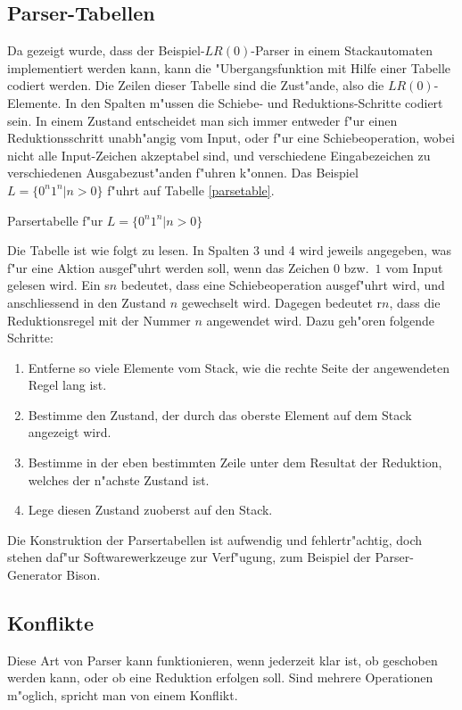\subsection{Parser-Tabellen}
Da gezeigt wurde, dass der Beispiel-$LR(0)$-Parser in einem Stackautomaten
implementiert werden kann, kann die "Ubergangsfunktion mit Hilfe
einer Tabelle codiert werden. Die Zeilen dieser Tabelle sind die
Zust"ande, also die $LR(0)$-Elemente. In den Spalten m"ussen die
Schiebe- und Reduktions-Schritte codiert sein. In einem Zustand
entscheidet man sich immer entweder f"ur einen Reduktionsschritt
unabh"angig vom Input, oder f"ur eine Schiebeoperation, wobei
nicht alle Input-Zeichen akzeptabel sind, und verschiedene Eingabezeichen
zu verschiedenen Ausgabezust"anden f"uhren k"onnen. Das Beispiel
$L=\{0^n1^n|n>0\}$ f"uhrt auf Tabelle \ref{parsetable}.
\begin{table}[H]

\caption{Parsertabelle f"ur $L=\{0^n1^n|n>0\}$\label{parsetable}}
\end{table}
Die Tabelle ist wie folgt zu lesen. In Spalten 3 und 4 wird jeweils
angegeben, was f"ur eine Aktion ausgef"uhrt werden soll, wenn das
Zeichen $0$ bzw.~$1$ vom Input gelesen wird. Ein s$n$ bedeutet, dass
eine Schiebeoperation ausgef"uhrt wird, und anschliessend in den
Zustand $n$ gewechselt wird. Dagegen bedeutet r$n$,
dass die Reduktionsregel mit der Nummer $n$ angewendet wird.
Dazu geh"oren folgende Schritte:
\begin{enumerate}
\item
Entferne so viele Elemente vom Stack, wie die rechte Seite der angewendeten
Regel lang ist.
\item
Bestimme den Zustand, der durch das oberste Element auf dem Stack
angezeigt wird.
\item
Bestimme in der eben bestimmten Zeile unter dem Resultat der Reduktion,
welches der n"achste Zustand ist.
\item
Lege diesen Zustand zuoberst auf den Stack.
\end{enumerate}
Die Konstruktion der Parsertabellen ist aufwendig und fehlertr"achtig,
doch stehen daf"ur Softwarewerkzeuge zur Verf"ugung, zum Beispiel
der Parser-Generator Bison.

\subsection{Konflikte}
Diese Art von Parser kann funktionieren, wenn jederzeit klar ist, ob
geschoben werden kann, oder ob eine Reduktion erfolgen soll.
Sind mehrere Operationen m"oglich, spricht man von einem Konflikt.
